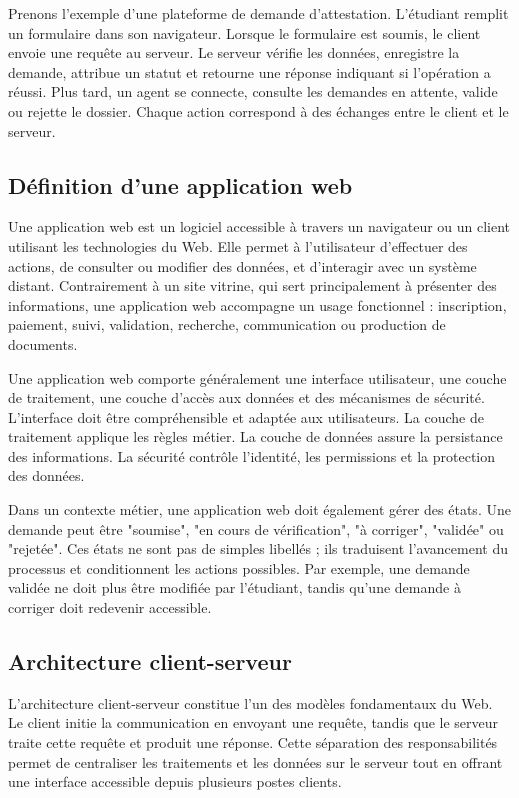Prenons l'exemple d'une plateforme de demande d'attestation. L'étudiant remplit un formulaire dans son navigateur. Lorsque le formulaire est soumis, le client envoie une requête au serveur. Le serveur vérifie les données, enregistre la demande, attribue un statut et retourne une réponse indiquant si l'opération a réussi. Plus tard, un agent se connecte, consulte les demandes en attente, valide ou rejette le dossier. Chaque action correspond à des échanges entre le client et le serveur.

\subsection{Définition d'une application web}

Une application web est un logiciel accessible à travers un navigateur ou un client utilisant les technologies du Web. Elle permet à l'utilisateur d'effectuer des actions, de consulter ou modifier des données, et d'interagir avec un système distant. Contrairement à un site vitrine, qui sert principalement à présenter des informations, une application web accompagne un usage fonctionnel : inscription, paiement, suivi, validation, recherche, communication ou production de documents.

Une application web comporte généralement une interface utilisateur, une couche de traitement, une couche d'accès aux données et des mécanismes de sécurité. L'interface doit être compréhensible et adaptée aux utilisateurs. La couche de traitement applique les règles métier. La couche de données assure la persistance des informations. La sécurité contrôle l'identité, les permissions et la protection des données.

Dans un contexte métier, une application web doit également gérer des états. Une demande peut être "soumise", "en cours de vérification", "à corriger", "validée" ou "rejetée". Ces états ne sont pas de simples libellés ; ils traduisent l'avancement du processus et conditionnent les actions possibles. Par exemple, une demande validée ne doit plus être modifiée par l'étudiant, tandis qu'une demande à corriger doit redevenir accessible.

\subsection{Architecture client-serveur}

L'architecture client-serveur constitue l'un des modèles fondamentaux du Web. Le client initie la communication en envoyant une requête, tandis que le serveur traite cette requête et produit une réponse. Cette séparation des responsabilités permet de centraliser les traitements et les données sur le serveur tout en offrant une interface accessible depuis plusieurs postes clients.

